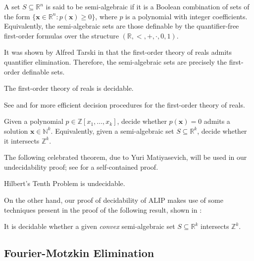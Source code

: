 A set $S \subseteq \mathbb{R}^{n}$ is said to be semi-algebraic if it is a Boolean combination of sets of the form $\lbrace \boldsymbol{x} \in \mathbb{R}^{n}: p(\boldsymbol{x}) \geq 0\rbrace$, where $p$ is a polynomial with integer coefficients. Equivalently, the semi-algebraic sets are those definable by the quantifier-free first-order formulas over the structure $(\mathbb{R}, <, +, \cdot, 0, 1)$.

It was shown by Alfred Tarski in \cite{Tarski} that the first-order theory of reals admits quantifier elimination. Therefore, the semi-algebraic sets are precisely the first-order definable sets.

\begin{theorem}[Tarski]
The first-order theory of reals is decidable.
\end{theorem}

See \cite{Renegar} and \cite{BPR06} for more efficient decision procedures for the first-order theory of reals.

\begin{definition}
Given a polynomial $p \in \mathbb{Z}[x_{1}, \ldots, x_{k}]$, decide whether $p(\boldsymbol{x}) = 0$ admits a solution $\boldsymbol{x} \in \mathbb{N}^{k}$. Equivalently, given a semi-algebraic set $S \subseteq \mathbb{R}^{k}$, decide whether it intersects $\mathbb{Z}^{k}$.
\end{definition}

The following celebrated theorem, due to Yuri Matiyasevich, will be used in
our undecidability proof; see \cite{HTP} for a self-contained proof.

\begin{theorem}[Matiyasevich]
Hilbert's Tenth Problem is undecidable.
\end{theorem}

On the other hand, our proof of decidability of ALIP makes use of some techniques present in the proof of the following result, shown in \cite{KP}:

\begin{theorem}
It is decidable whether a given \emph{convex} semi-algebraic set $S \subseteq \mathbb{R}^{k}$ intersects $\mathbb{Z}^{k}$.
\end{theorem}

\subsection{Fourier-Motzkin Elimination}

